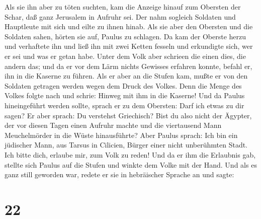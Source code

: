  Als sie ihn aber zu töten suchten, kam die Anzeige
hinauf zum Obersten der Schar, daß ganz Jerusalem in Aufruhr sei.
 Der nahm sogleich Soldaten und Hauptleute mit sich und
eilte zu ihnen hinab. Als sie aber den Obersten und die Soldaten sahen,
hörten sie auf, Paulus zu schlagen.  Da kam der Oberste
herzu und verhaftete ihn und ließ ihn mit zwei Ketten fesseln und
erkundigte sich, wer er sei und was er getan habe.  Unter
dem Volk aber schrieen die einen dies, die andern das; und da er vor dem
Lärm nichts Gewisses erfahren konnte, befahl er, ihn in die Kaserne zu
führen.  Als er aber an die Stufen kam, mußte er von den
Soldaten getragen werden wegen dem Druck des Volkes. 
Denn die Menge des Volkes folgte nach und schrie: Hinweg mit ihm in die
Kaserne!  Und da Paulus hineingeführt werden sollte,
sprach er zu dem Obersten: Darf ich etwas zu dir sagen? Er aber sprach:
Du verstehst Griechisch?  Bist du also nicht der Ägypter,
der vor diesen Tagen einen Aufruhr machte und die viertausend Mann
Meuchelmörder in die Wüste hinausführte?  Aber Paulus
sprach: Ich bin ein jüdischer Mann, aus Tarsus in Cilicien, Bürger einer
nicht unberühmten Stadt. Ich bitte dich, erlaube mir, zum Volk zu reden!
 Und da er ihm die Erlaubnis gab, stellte sich Paulus auf
die Stufen und winkte dem Volke mit der Hand. Und als es ganz still
geworden war, redete er sie in hebräischer Sprache an und sagte:

\hypertarget{section-21}{%
\section{22}\label{section-21}}

